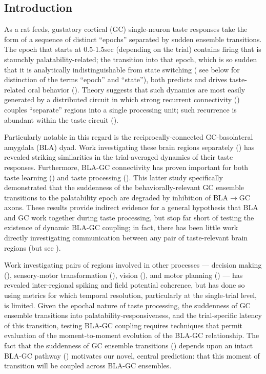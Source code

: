 \begin{refsection}
\section{Introduction}
As a rat feeds, gustatory cortical (GC) single-neuron taste responses take the form of a sequence of distinct “epochs” separated by sudden ensemble transitions. The epoch that starts at 0.5-1.5sec (depending on the trial) contains firing that is staunchly palatability-related; the transition into that epoch, which is so sudden that it is analytically indistinguishable from state switching (\cite{sadacca2016a} see below for distinction of the terms “epoch” and “state”), both predicts and drives taste-related oral behavior (\cite{sadacca2012a,li2016a,mukherjee2019a}). Theory suggests that such dynamics are most easily generated by a distributed circuit in which strong recurrent connectivity (\cite{maass2007a, miller2010a, miller2013a,edelman2013a,mante2013a,kietzmann2019a}) couples “separate” regions into a single processing unit; such recurrence is abundant within the taste circuit (\cite{bielavska1996a,mcdonald1998a,shi1998a}).

Particularly notable in this regard is the reciprocally-connected GC-basolateral amygdala (BLA) dyad. Work investigating these brain regions separately (\cite{katz2001a,fontanini2009a,sadacca2012a}) has revealed striking similarities in the trial-averaged dynamics of their taste responses. Furthermore, BLA-GC connectivity has proven important for both taste learning (\cite{lin2012a,lin2015a,lavi2018a,kayyal2019a}) and taste processing (\cite{lin2021a}). This latter study specifically demonstrated that the suddenness of the behaviorally-relevant GC ensemble transitions to the palatability epoch are degraded by inhibition of BLA$\rightarrow$GC axons. These results provide indirect evidence for a general hypothesis that BLA and GC work together during taste processing, but stop far short of testing the existence of dynamic BLA-GC coupling; in fact, there has been little work directly investigating communication between any pair of taste-relevant brain regions (but see \cite{lorenzo1997a}).

Work investigating pairs of regions involved in other processes --- decision making (\cite{antzoulatos2016a,place2016a,zielinski2019a}), sensory-motor transformation (\cite{arce-mcshane2016a}), vision (\cite{bastos2015a,zandvakili2015a,saravani2019a,lundqvist2020a}), and motor planning (\cite{yates2017a,ames2019a}) --- has revealed inter-regional spiking and field potential coherence, but has done so using metrics for which temporal resolution, particularly at the single-trial level, is limited. Given the epochal nature of taste processing, the suddenness of GC ensemble transitions into palatability-responsiveness, and the trial-specific latency of this transition, testing BLA-GC coupling requires techniques that permit evaluation of the moment-to-moment evolution of the BLA-GC relationship. The fact that the suddenness of GC ensemble transitions (\cite{sadacca2016a,mukherjee2019a}) depends upon an intact BLA-GC pathway (\cite{lin2021a}) motivates our novel, central prediction: that this moment of transition will be coupled across BLA-GC ensembles. 


\end{refsection}
